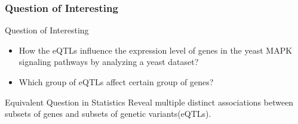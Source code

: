 \begin{frame}\frametitle{Question of Interesting}
    \begin{block}{Question of Interesting}
        \begin{itemize}
        \item How the eQTLs influence the expression level of genes in the yeast MAPK signaling pathways by analyzing a yeast dataset?
        \item Which group of eQTLs affect certain group of genes?
        \end{itemize}
    \end{block}
    
    \begin{block}{Equivalent Question in Statistics}
        Reveal multiple distinct associations between subsets of genes and subsets of genetic variants(eQTLs).
    \end{block}
\end{frame}
